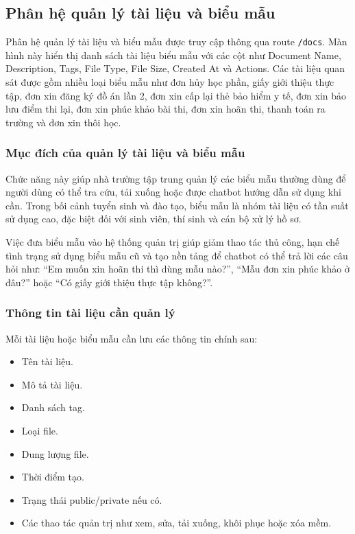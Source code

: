 \subsection{Phân hệ quản lý tài liệu và biểu mẫu}

Phân hệ quản lý tài liệu và biểu mẫu được truy cập thông qua route \texttt{/docs}. Màn hình này hiển thị danh sách tài liệu biểu mẫu với các cột như Document Name, Description, Tags, File Type, File Size, Created At và Actions. Các tài liệu quan sát được gồm nhiều loại biểu mẫu như đơn hủy học phần, giấy giới thiệu thực tập, đơn xin đăng ký đồ án lần 2, đơn xin cấp lại thẻ bảo hiểm y tế, đơn xin bảo lưu điểm thi lại, đơn xin phúc khảo bài thi, đơn xin hoãn thi, thanh toán ra trường và đơn xin thôi học.

\subsubsection{Mục đích của quản lý tài liệu và biểu mẫu}

Chức năng này giúp nhà trường tập trung quản lý các biểu mẫu thường dùng để người dùng có thể tra cứu, tải xuống hoặc được chatbot hướng dẫn sử dụng khi cần. Trong bối cảnh tuyển sinh và đào tạo, biểu mẫu là nhóm tài liệu có tần suất sử dụng cao, đặc biệt đối với sinh viên, thí sinh và cán bộ xử lý hồ sơ.

Việc đưa biểu mẫu vào hệ thống quản trị giúp giảm thao tác thủ công, hạn chế tình trạng sử dụng biểu mẫu cũ và tạo nền tảng để chatbot có thể trả lời các câu hỏi như: ``Em muốn xin hoãn thi thì dùng mẫu nào?'', ``Mẫu đơn xin phúc khảo ở đâu?'' hoặc ``Có giấy giới thiệu thực tập không?''.

\subsubsection{Thông tin tài liệu cần quản lý}

Mỗi tài liệu hoặc biểu mẫu cần lưu các thông tin chính sau:

\begin{itemize}
    \item Tên tài liệu.
    \item Mô tả tài liệu.
    \item Danh sách tag.
    \item Loại file.
    \item Dung lượng file.
    \item Thời điểm tạo.
    \item Trạng thái public/private nếu có.
    \item Các thao tác quản trị như xem, sửa, tải xuống, khôi phục hoặc xóa mềm.
\end{itemize}


